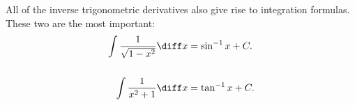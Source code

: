 \begin{frame}
All of the inverse trigonometric derivatives also give rise to integration formulas.  These two are the most important:
\begin{align*}
\int \frac{1}{\sqrt{1-x^2}}\diff x & = \sin^{-1} x + C.\\
& \\
\int \frac{1}{x^2 + 1}\diff x & = \tan^{-1} x + C.
\end{align*}
\end{frame}
